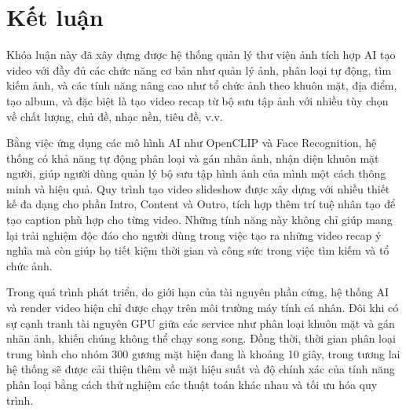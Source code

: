 \chapter*{Kết luận}

Khóa luận này đã xây dựng được hệ thống quản lý thư viện ảnh tích hợp AI tạo video với đầy đủ các chức năng cơ bản như quản lý ảnh, phân loại tự động, tìm kiếm ảnh, và các tính năng nâng cao như tổ chức ảnh theo khuôn mặt, địa điểm, tạo album, và đặc biệt là tạo video recap từ bộ sưu tập ảnh với nhiều tùy chọn về chất lượng, chủ đề, nhạc nền, tiêu đề, v.v.

Bằng việc ứng dụng các mô hình AI như OpenCLIP và Face Recognition, hệ thống có khả năng tự động phân loại và gán nhãn ảnh, nhận diện khuôn mặt người, giúp người dùng quản lý bộ sưu tập hình ảnh của mình một cách thông minh và hiệu quả. Quy trình tạo video slideshow được xây dựng với nhiều thiết kế đa dạng cho phần Intro, Content và Outro, tích hợp thêm trí tuệ nhân tạo để tạo caption phù hợp cho từng video. Những tính năng này không chỉ giúp mang lại trải nghiệm độc đáo cho người dùng trong việc tạo ra những video recap ý nghĩa mà còn giúp họ tiết kiệm thời gian và công sức trong việc tìm kiếm và tổ chức ảnh.

Trong quá trình phát triển, do giới hạn của tài nguyên phần cứng, hệ thống AI và render video hiện chỉ được chạy trên môi trường máy tính cá nhân. Đôi khi có sự cạnh tranh tài nguyên GPU giữa các service như phân loại khuôn mặt và gán nhãn ảnh, khiến chúng không thể chạy song song. Đồng thời, thời gian phân loại trung bình cho nhóm 300 gương mặt hiện đang là khoảng 10 giây, trong tương lai hệ thống sẽ được cải thiện thêm về mặt hiệu suất và độ chính xác của tính năng phân loại bằng cách thử nghiệm các thuật toán khác nhau và tối ưu hóa quy trình. 